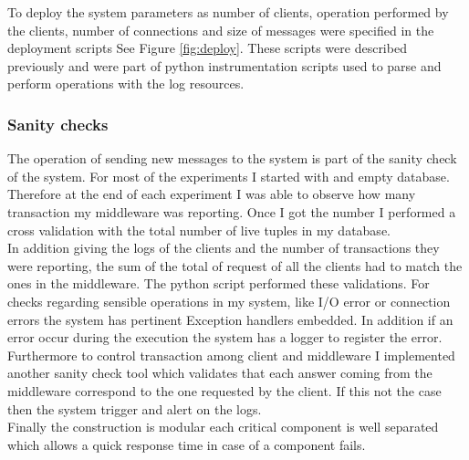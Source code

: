 To deploy the system parameters as number of clients, operation performed by the clients, number of connections and size of messages were specified in the deployment scripts See Figure \ref{fig:deploy}. These scripts were described previously and were part of python instrumentation scripts used to parse and perform operations with the log resources.


\subsubsection{Sanity checks}\label{sec:sanity-checks}
The operation of sending new messages to the system is part of the sanity check of the system. For most of the experiments I started with and empty database. Therefore at the end of each experiment I was able to observe how many transaction my middleware was reporting. Once I got the number I performed a cross validation with the total number of live tuples in my database.\\
 
In addition giving the logs of the clients and the number of transactions they were reporting, the sum of the total of request of all the clients had to match the ones in the middleware. The python script performed these validations.
For checks regarding sensible operations in my system, like I/O error or connection errors the system has pertinent Exception handlers embedded. In addition if an error occur during the execution the system has a logger to register the error.\\

Furthermore to control transaction among client and middleware I implemented another sanity check tool which validates that each answer coming from the middleware correspond to the one requested by the client. If this not the case then the system trigger and alert on the logs.\\

Finally the construction is modular each critical component is well separated which allows a quick response time in case of a component fails. 
